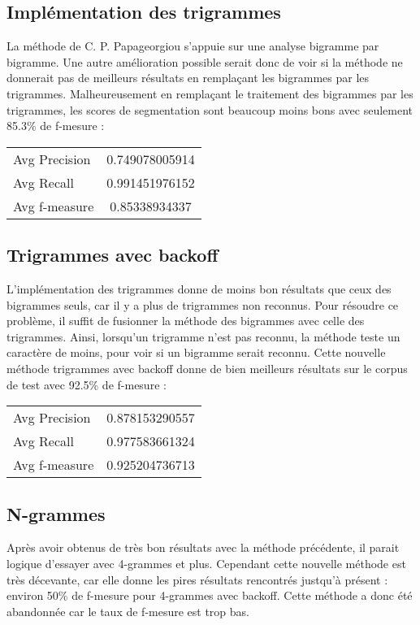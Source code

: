 
\subsection{Implémentation des trigrammes}

La méthode de C. P. Papageorgiou s'appuie sur une analyse bigramme par bigramme. Une autre amélioration possible serait donc de voir si la méthode ne donnerait pas de meilleurs résultats en remplaçant les bigrammes par les trigrammes. Malheureusement en remplaçant le traitement des bigrammes par les trigrammes, les scores de segmentation sont beaucoup moins bons avec seulement 85.3\% de f-mesure :
\begin{center}
	\begin{tabular}{|l c|}
	  	\hline
	  	Avg Precision & 0.749078005914 \\
		Avg Recall & 0.991451976152 \\
		Avg f-measure & 0.85338934337 \\
	  	\hline
	\end{tabular}
\end{center}


\subsection{Trigrammes avec backoff}

L'implémentation des trigrammes donne de moins bon résultats que ceux des bigrammes seuls, car il y a plus de trigrammes non reconnus. Pour résoudre ce problème, il suffit de fusionner la méthode des bigrammes avec celle des trigrammes. Ainsi, lorsqu'un trigramme n'est pas reconnu, la méthode teste un caractère de moins, pour voir si un bigramme serait reconnu. Cette nouvelle méthode trigrammes avec backoff donne de bien meilleurs résultats sur le corpus de test avec 92.5\% de f-mesure :
\begin{center}
	\begin{tabular}{|l c|}
	  	\hline
	  	Avg Precision & 0.878153290557 \\
		Avg Recall & 0.977583661324 \\
		Avg f-measure & 0.925204736713 \\
	  	\hline
	\end{tabular}
\end{center}


\subsection{N-grammes}

Après avoir obtenus de très bon résultats avec la méthode précédente, il parait logique d'essayer avec 4-grammes et plus. Cependant cette nouvelle méthode est très décevante, car elle donne les pires résultats rencontrés justqu'à présent : environ 50\% de f-mesure pour 4-grammes avec backoff. Cette méthode a donc été abandonnée car le taux de f-mesure est trop bas.
